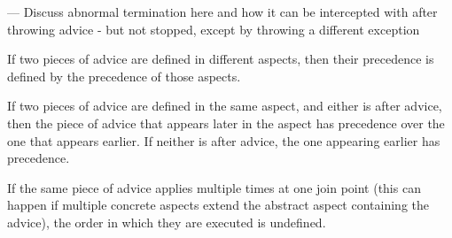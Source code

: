 \documentclass[12pt,a4paper]{report}
\begin{document}
--- Discuss abnormal termination here and how it can be intercepted with
after throwing advice - but not stopped, except by throwing a different
exception

If two pieces of advice are defined 
in different aspects, then their precedence is defined by the precedence
of those aspects.

If two pieces of advice are defined in the same aspect, and either is after
advice, then the piece of advice that appears later in the aspect has 
precedence over the one that appears earlier. If neither is after advice,
the one appearing earlier has precedence.

If the same piece of advice applies multiple times at one join point
(this can happen if multiple concrete aspects extend the abstract aspect
containing the advice), the order in which they are executed is undefined.
\end{document}
